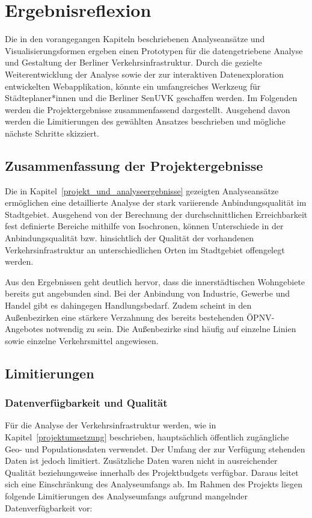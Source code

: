 \newpage


\section{Ergebnisreflexion}
\label{ergebnisreflexion}

Die in den vorangegangen Kapiteln beschriebenen Analyseansätze und Visualisierungsformen ergeben einen Prototypen für die datengetriebene Analyse und Gestaltung der Berliner Verkehrsinfrastruktur. Durch die gezielte Weiterentwicklung der Analyse sowie der zur interaktiven Datenexploration entwickelten Webapplikation, könnte ein umfangreiches Werkzeug für Städteplaner*innen und die Berliner \ac{SenUVK} geschaffen werden. Im Folgenden werden die Projektergebnisse zusammenfassend dargestellt. Ausgehend davon werden die Limitierungen des gewählten Ansatzes beschrieben und mögliche nächste Schritte skizziert.

\subsection{Zusammenfassung der Projektergebnisse}
Die in Kapitel~\ref{projekt_und_analyseergebnisse} gezeigten Analyseansätze ermöglichen eine detaillierte Analyse der stark variierende Anbindungsqualität im Stadtgebiet. Ausgehend von der Berechnung der durchschnittlichen Erreichbarkeit fest definierte Bereiche mithilfe von Isochronen, können Unterschiede in der Anbindungsqualität bzw. hinsichtlich der Qualität der vorhandenen Verkehrsinfrastruktur an unterschiedlichen Orten im Stadtgebiet offengelegt werden.

Aus den Ergebnissen geht deutlich hervor, dass die innerstädtischen Wohngebiete bereits gut angebunden sind. Bei der Anbindung von Industrie, Gewerbe und Handel gibt es dahingegen Handlungsbedarf. Zudem scheint in den Außenbezirken eine stärkere Verzahnung des bereits bestehenden ÖPNV-Angebotes notwendig zu sein. Die Außenbezirke sind häufig auf einzelne Linien sowie einzelne Verkehrsmittel angewiesen.

\subsection{Limitierungen}\label{limitierung}

\subsubsection{Datenverfügbarkeit und Qualität}
Für die Analyse der Verkehrsinfrastruktur werden, wie in Kapitel~\ref{projektumsetzung} beschrieben, hauptsächlich öffentlich zugängliche Geo- und Populationsdaten verwendet. Der Umfang der zur Verfügung stehenden Daten ist jedoch limitiert. Zusätzliche Daten waren nicht in ausreichender Qualität beziehungsweise innerhalb des Projektbudgets verfügbar. Daraus leitet sich eine Einschränkung des Analyseumfangs ab. Im Rahmen des Projekts liegen folgende Limitierungen des Analyseumfangs aufgrund mangelnder Datenverfügbarkeit vor:

